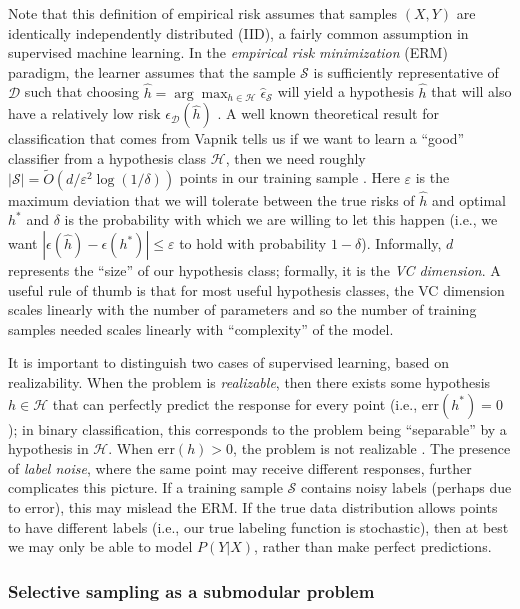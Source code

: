 \noindent Note that this definition of empirical risk assumes that samples $(X, Y)$ are identically independently distributed (IID), a fairly common assumption in supervised machine learning. In the \textit{empirical risk minimization} (ERM) paradigm, the learner assumes that the sample $\mathcal{S}$ is sufficiently representative of $\mathcal{D}$ such that choosing $\hat{h} = \arg\max_{h \in \mathcal{H}} \hat{\epsilon}_{\mathcal{S}}$ will yield a hypothesis $\hat{h}$ that will also have a relatively low risk $\epsilon_{\mathcal{D}}(\hat{h})$ \cite{Vapnik:2000}. A well known theoretical result for classification that comes from Vapnik tells us if we want to learn a ``good'' classifier from a hypothesis class $\mathcal{H}$, then we need roughly $|\mathcal{S}| = \widetilde{O}\left(d/\varepsilon^2 \log (1/\delta)\right)$ points in our training sample \cite{Vapnik:1999}. Here $\varepsilon$ is the maximum deviation that we will tolerate between the true risks of $\hat{h}$ and optimal $h^\ast$ and $\delta$ is the probability with which we are willing to let this happen (i.e., we want $|\epsilon(\hat{h}) - \epsilon(h^\ast)| \leq \varepsilon$ to hold with probability $1-\delta$). Informally, $d$ represents the ``size'' of our hypothesis class; formally, it is the \textit{VC dimension}. A useful rule of thumb is that for most useful hypothesis classes, the VC dimension scales linearly with the number of parameters and so the number of training samples needed scales linearly with ``complexity'' of the model.

It is important to distinguish two cases of supervised learning, based on realizability. When the problem is \textit{realizable}, then there exists some hypothesis $h \in \mathcal{H}$ that can perfectly predict the response for every point (i.e., $\mathrm{err}(h^\ast) = 0$); in binary classification, this corresponds to the problem being ``separable'' by a hypothesis in $\mathcal{H}$. When $\mathrm{err}(h) > 0$, the problem is not realizable \cite{dasgupta2011}. The presence of \textit{label noise}, where the same point may receive different responses, further complicates this picture. If a training sample $\mathcal{S}$ contains noisy labels (perhaps due to error), this may mislead the ERM. If the true data distribution allows points to have different labels (i.e., our true labeling function is stochastic), then at best we may only be able to model $P(Y|X)$, rather than make perfect predictions.

\subsubsection{Selective sampling as a submodular problem}

